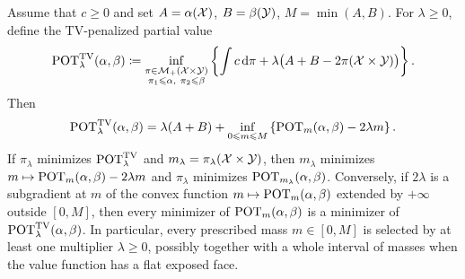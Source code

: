 \begin{prop}\label{prop-tv-partial-ot-lagrange}
	Assume that $c\geq0$ and set $A=\alpha(\mathcal{X})$, $B=\beta(\mathcal{Y})$, $M=\min(A,B)$. For $\lambda\geq0$, define the TV-penalized partial value
	\[
		\operatorname{POT}^{\TV}_\lambda(\al,\be)
		\eqdef
		\inf_{\substack{\pi\in\Mm_+(\Xx\times\Yy)\\ \pi_1\leq\al,\ \pi_2\leq\be}}
		\left\{
		\int c\,\d\pi
		+
		\lambda\big(A+B-2\pi(\Xx\times\Yy)\big)
		\right\}.
	\]
	Then
	\[
		\operatorname{POT}^{\operatorname{TV}}_\lambda(\alpha,\beta)
		=
		\lambda(A+B)
		+
		\inf_{0\leqslant m\leqslant M}
		\left\{
		\operatorname{POT}_m(\alpha,\beta)-2\lambda m
		\right\}.
	\]
	If $\pi_\lambda$ minimizes $\operatorname{POT}^{\operatorname{TV}}_\lambda$ and $m_\lambda=\pi_\lambda(\mathcal{X}\times\mathcal{Y})$, then $m_\lambda$ minimizes $m\mapsto\operatorname{POT}_m(\alpha,\beta)-2\lambda m$ and $\pi_\lambda$ minimizes $\operatorname{POT}_{m_\lambda}(\alpha,\beta)$. Conversely, if $2\lambda$ is a subgradient at $m$ of the convex function $m\mapsto\operatorname{POT}_m(\alpha,\beta)$ extended by $+\infty$ outside $[0,M]$, then every minimizer of $\operatorname{POT}_m(\alpha,\beta)$ is a minimizer of $\operatorname{POT}^{\operatorname{TV}}_\lambda(\alpha,\beta)$. In particular, every prescribed mass $m\in[0,M]$ is selected by at least one multiplier $\lambda\geq0$, possibly together with a whole interval of masses when the value function has a flat exposed face.
\end{prop}

